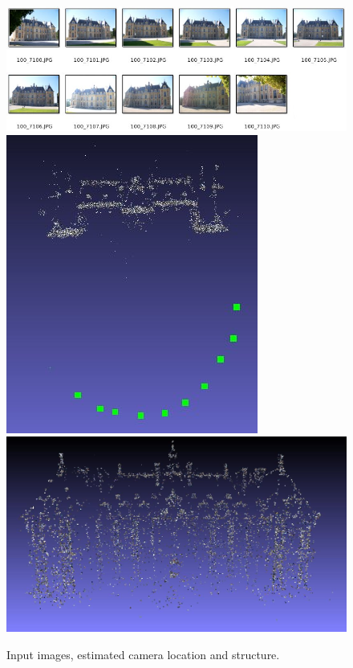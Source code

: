\documentclass[11pt, letterpaper]{report}
\begin{document}
\noindent
\begin{figure}[h!]
\begin{center}
\includegraphics[scale=.4]{figures/sfm/input_images.jpg}
\newline
\hfill
\includegraphics[scale=.46]{figures/sfm/sceaux_camLocation.jpg}
\hspace{1cm}
\includegraphics[scale=.21]{figures/sfm/sparse_Front.jpg}
\hfill
\end{center}
\caption{Input images, estimated camera location and structure.}
\label{fig:SfM_2}
\end{figure}
\end{document}
